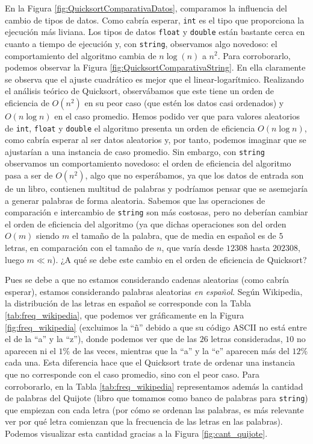 \documentclass[12pt]{article}
\begin{document}
    En la Figura \ref{fig:QuicksortComparativaDatos}, comparamos la influencia del cambio de tipos de datos. Como cabría esperar,
    \verb|int| es el tipo que proporciona la ejecución más liviana. Los tipos de datos \verb|float| y \verb|double| están bastante cerca en cuanto a tiempo de ejecución y, con
    \verb|string|, observamos algo novedoso: el comportamiento del algoritmo cambia de $n\log(n)$ a $n^2$. Para corroborarlo, podemos observar la
    Figura \ref{fig:QuicksortComparativaString}. En ella claramente se observa que el ajuste cuadrático es mejor que el linear-logarítmico.
    Realizando el análisis teórico de Quicksort, observábamos que este tiene un orden de eficiencia de $O(n^2)$ en su peor caso (que estén los datos casi ordenados) y
    $O(n\log n)$ en el caso promedio. Hemos podido ver que para valores aleatorios de \verb|int|, \verb|float| y \verb|double| el algoritmo presenta un orden de eficiencia
    $O(n\log n)$, como cabría esperar al ser datos aleatorios y, por tanto, podemos imaginar que se ajustarían a una instancia de caso promedio. Sin embargo, con \verb|string|
    observamos un comportamiento novedoso: el orden de eficiencia del algoritmo pasa a ser de $O(n^2)$, algo que no esperábamos, ya que los datos de entrada son de un libro,
    contienen multitud de palabras y podríamos pensar que se asemejaría a generar palabras de forma aleatoria. Sabemos que las operaciones de comparación e intercambio de
    \verb|string| son más costosas, pero no deberían cambiar el orden de eficiencia del algoritmo (ya que dichas operaciones son del orden $O(m)$ siendo $m$ el tamaño de la palabra,
    que de media en español es de $5$ letras,
    en comparación con el tamaño de $n$, que varía desde $12308$ hasta $202308$, luego $m\ll n$). ¿A qué se debe este cambio en el orden de eficiencia de Quicksort?

    Pues se debe a que no estamos considerando cadenas aleatorias (como cabría esperar), estamos considerando palabras aleatorias \emph{en español}. Según Wikipedia, la distribución de las letras en español se corresponde con la Tabla \ref{tab:freq_wikipedia}, que podemos ver gráficamente en la Figura \ref{fig:freq_wikipedia} (excluimos la ``ñ'' debido a que su código ASCII no está entre el de la ``a'' y la ``z''), donde podemos ver que de las $26$ letras consideradas, $10$ no aparecen ni el $1\%$ de las veces, mientras que la ``a'' y la ``e'' aparecen más del $12\%$ cada una. Esta diferencia hace que el Quicksort trate de ordenar una instancia que no corresponde con el caso promedio, sino con el peor caso. Para corroborarlo, en la Tabla \ref{tab:freq_wikipedia} representamos además la cantidad de palabras del Quijote (libro que tomamos como banco de palabras para \verb|string|) que empiezan con cada letra (por cómo se ordenan las palabras, es más relevante ver por qué letra comienzan que la frecuencia de las letras en las palabras). Podemos visualizar esta cantidad gracias a la Figura \ref{fig:cant_quijote}.
    
\end{document}
